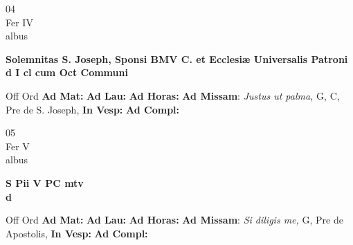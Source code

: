 \documentclass[10pt, openany]{book}
\begin{document}
        \begin{center}
            \begin{minipage}{3.5in}
                \vspace{2em}
                \begin{minipage}{0.5in}
                    {\Huge 04} \\
                    {\normalsize Fer IV} \\
                    {\normalsize albus}
                \end{minipage}
                \begin{minipage}{3.0in}
                    \textbf{ \large Solemnitas S. Joseph, Sponsi BMV C. et Ecclesiæ Universalis Patroni \\
                    \textnormal{\normalsize d I cl cum Oct Communi}} \\ 
                \end{minipage}
                \begin{justify}Off Ord
                    \textbf{Ad Mat: }
                    \textbf{Ad Lau: }
                    \textbf{Ad Horas: }\textbf{Ad Missam}: \textit{Justus ut palma,} G, C, Pre de S. Joseph,  
                    \textbf{In Vesp: }
                    \textbf{Ad Compl: }
                \end{justify}
            \end{minipage}
        \end{center}
    
        \begin{center}
            \begin{minipage}{3.5in}
                \vspace{2em}
                \begin{minipage}{0.5in}
                    {\Huge 05} \\
                    {\normalsize Fer V} \\
                    {\normalsize albus}
                \end{minipage}
                \begin{minipage}{3.0in}
                    \textbf{ \large S Pii V PC mtv \\
                    \textnormal{\normalsize d}} \\ 
                \end{minipage}
                \begin{justify}Off Ord
                    \textbf{Ad Mat: }
                    \textbf{Ad Lau: }
                    \textbf{Ad Horas: }\textbf{Ad Missam}: \textit{Si diligis me,} G, Pre de Apostolis,  
                    \textbf{In Vesp: }
                    \textbf{Ad Compl: }
                \end{justify}
            \end{minipage}
        \end{center}
    
\end{document}
